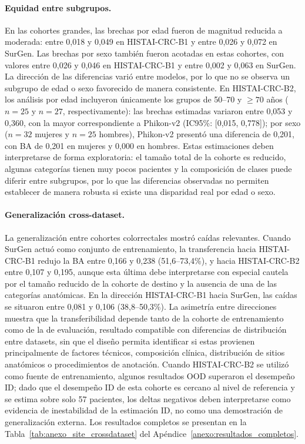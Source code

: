 \paragraph{Equidad entre subgrupos.} En las cohortes grandes, las brechas por edad fueron de magnitud reducida a moderada: entre 0,018 y 0,049 en HISTAI-CRC-B1 y entre 0,026 y 0,072 en SurGen. Las brechas por sexo también fueron acotadas en estas cohortes, con valores entre 0,026 y 0,046 en HISTAI-CRC-B1 y entre 0,002 y 0,063 en SurGen. La dirección de las diferencias varió entre modelos, por lo que no se observa un subgrupo de edad o sexo favorecido de manera consistente. En HISTAI-CRC-B2, los análisis por edad incluyeron únicamente los grupos de 50--70 y $\geq 70$ años ($n=25$ y $n=27$, respectivamente): las brechas estimadas variaron entre 0,053 y 0,360, con la mayor correspondiente a Phikon-v2 (IC95\%: [0,015, 0,778]); por sexo ($n=32$ mujeres y $n=25$ hombres), Phikon-v2 presentó una diferencia de 0,201, con BA de 0,201 en mujeres y 0,000 en hombres. Estas estimaciones deben interpretarse de forma exploratoria: el tamaño total de la cohorte es reducido, algunas categorías tienen muy pocos pacientes y la composición de clases puede diferir entre subgrupos, por lo que las diferencias observadas no permiten establecer de manera robusta si existe una disparidad real por edad o sexo.

\paragraph{Generalización cross-dataset.} La generalización entre cohortes colorrectales mostró caídas relevantes. Cuando SurGen actuó como conjunto de entrenamiento, la transferencia hacia HISTAI-CRC-B1 redujo la BA entre 0,166 y 0,238 (51,6--73,4\%), y hacia HISTAI-CRC-B2 entre 0,107 y 0,195, aunque esta última debe interpretarse con especial cautela por el tamaño reducido de la cohorte de destino y la ausencia de una de las categorías anatómicas. En la dirección HISTAI-CRC-B1 hacia SurGen, las caídas se situaron entre 0,081 y 0,106 (38,8--50,3\%). La asimetría entre direcciones muestra que la transferibilidad depende tanto de la cohorte de entrenamiento como de la de evaluación, resultado compatible con diferencias de distribución entre datasets, sin que el diseño permita identificar si estas provienen principalmente de factores técnicos, composición clínica, distribución de sitios anatómicos o procedimientos de anotación. Cuando HISTAI-CRC-B2 se utilizó como fuente de entrenamiento, algunos resultados OOD superaron el desempeño ID; dado que el desempeño ID de esta cohorte es cercano al nivel de referencia y se estima sobre solo 57 pacientes, los deltas negativos deben interpretarse como evidencia de inestabilidad de la estimación ID, no como una demostración de generalización externa. Los resultados completos se presentan en la Tabla~\ref{tab:anexo_site_crossdataset} del Apéndice~\ref{anexo:resultados_completos}.

